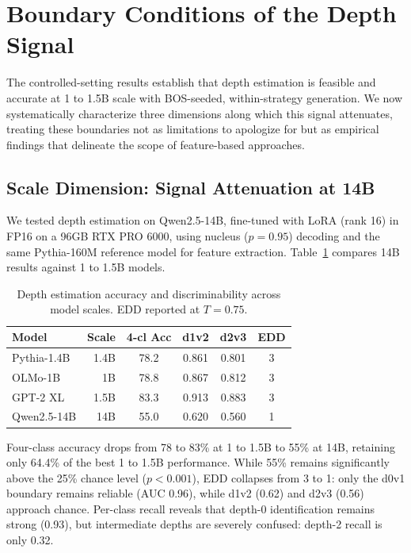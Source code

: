 \documentclass[11pt,a4paper]{article}
\begin{document}
\section{Boundary Conditions of the Depth Signal}
\label{sec:boundary}

The controlled-setting results establish that depth estimation is feasible and accurate at 1 to 1.5B scale with BOS-seeded, within-strategy generation.
We now systematically characterize three dimensions along which this signal attenuates, treating these boundaries not as limitations to apologize for but as empirical findings that delineate the scope of feature-based approaches.

\subsection{Scale Dimension: Signal Attenuation at 14B}
\label{sec:scale}

We tested depth estimation on Qwen2.5-14B, fine-tuned with LoRA (rank 16) in FP16 on a 96GB RTX PRO 6000, using nucleus ($p{=}0.95$) decoding and the same Pythia-160M reference model for feature extraction.
Table~\ref{tab:scale} compares 14B results against 1 to 1.5B models.

\begin{table}[t]
\centering
\caption{Depth estimation accuracy and discriminability across model scales. EDD reported at $T{=}0.75$.}
\label{tab:scale}
\small
\begin{tabular}{lrcccc}
\toprule
Model & Scale & 4-cl Acc & d1v2 & d2v3 & EDD \\
\midrule
Pythia-1.4B  & 1.4B & 78.2 & 0.861 & 0.801 & 3 \\
OLMo-1B     & 1B   & 78.8 & 0.867 & 0.812 & 3 \\
GPT-2 XL    & 1.5B & 83.3 & 0.913 & 0.883 & 3 \\
\midrule
Qwen2.5-14B & 14B  & 55.0 & 0.620 & 0.560 & 1 \\
\bottomrule
\end{tabular}
\end{table}

Four-class accuracy drops from 78 to 83\% at 1 to 1.5B to 55\% at 14B, retaining only 64.4\% of the best 1 to 1.5B performance.
While 55\% remains significantly above the 25\% chance level ($p < 0.001$), EDD collapses from 3 to 1: only the d0v1 boundary remains reliable (AUC 0.96), while d1v2 (0.62) and d2v3 (0.56) approach chance.
Per-class recall reveals that depth-0 identification remains strong (0.93), but intermediate depths are severely confused: depth-2 recall is only 0.32.
\end{document}
